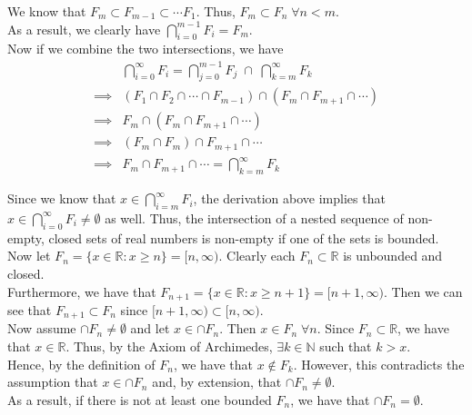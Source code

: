 \documentclass[12pt]{article}
\newenvironment{problem}[2][Problem]{\begin{trivlist}
\item[\hskip \labelsep {\bfseries #1}\hskip \labelsep {\bfseries #2.}]}{\end{trivlist}}
\begin{document}
We know that $F_m \subset F_{m-1} \subset \cdots F_{1}$. Thus, $F_{m} \subset F_n \; \forall n < m$.\\

As a result, we clearly have $\bigcap^{m-1}_{i=0} F_i = F_m$.\\

Now if we combine the two intersections, we have
\begin{align*}
&\bigcap^\infty_{i=0} F_i = \bigcap^{m-1}_{j=0} F_j \; \cap \; \bigcap^\infty_{k=m} F_k\\
\implies &(F_1 \cap F_2 \cap \cdots \cap F_{m-1}) \cap (F_{m} \cap F_{m+1} \cap \cdots)\\
\implies &F_{m} \cap (F_{m} \cap F_{m+1} \cap \cdots)\\
\implies &(F_m \cap F_m) \cap F_{m+1} \cap \cdots\\
\implies &F_m \cap F_{m+1} \cap \cdots = \bigcap^\infty_{k=m} F_k
\end{align*}

Since we know that $x \in \bigcap^\infty_{i=m} F_i$, the derivation above implies that $x \in \bigcap^\infty_{i=0} F_i \neq \emptyset$ as well. Thus, the intersection of a nested sequence of non-empty, closed sets of real numbers is non-empty if one of the sets is bounded.\\

Now let $F_n = \{x \in \mathbb{R}: x \geq n\} = [n, \infty)$. Clearly each $F_n \subset \mathbb{R}$ is unbounded and closed.\\ 

Furthermore, we have that $F_{n+1} = \{x \in \mathbb{R}: x \geq n+1\} = [n+1, \infty)$. Then we can see that $F_{n+1} \subset F_n$ since $[n+1, \infty) \subset [n, \infty)$.\\

Now assume $\cap F_n \neq \emptyset$ and let $x \in \cap F_n$. Then $x \in F_n \; \forall n$. Since $F_n \subset \mathbb{R}$, we have that $x \in \mathbb{R}$. Thus, by the Axiom of Archimedes, $\exists k \in \mathbb{N}$ such that $k > x$.\\

Hence, by the definition of $F_n$, we have that $x \not\in F_k$. However, this contradicts the assumption that $x \in \cap F_n$ and, by extension, that $\cap F_n \neq \emptyset$.\\

As a result, if there is not at least one bounded $F_n$, we have that $\cap F_n = \emptyset$.

\begin{problem}{2}
\end{problem}
\end{document}
